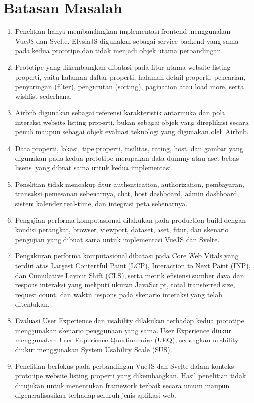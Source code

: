 \documentclass[12pt,a4paper]{report}
\begin{document}
\section{Batasan Masalah}
\begin{enumerate}
    \item Penelitian hanya membandingkan implementasi frontend menggunakan VueJS dan Svelte. ElysiaJS digunakan sebagai service backend yang sama pada kedua prototipe dan tidak menjadi objek utama perbandingan.
    \item Prototipe yang dikembangkan dibatasi pada fitur utama website listing properti, yaitu halaman daftar properti, halaman detail properti, pencarian, penyaringan (filter), pengurutan (sorting), pagination atau load more, serta wishlist sederhana.
    \item Airbnb digunakan sebagai referensi karakteristik antarmuka dan pola interaksi website listing properti, bukan sebagai objek yang direplikasi secara penuh maupun sebagai objek evaluasi teknologi yang digunakan oleh Airbnb.
    \item Data properti, lokasi, tipe properti, fasilitas, rating, host, dan gambar yang digunakan pada kedua prototipe merupakan data dummy atau aset bebas lisensi yang dibuat sama untuk kedua implementasi.
    \item Penelitian tidak mencakup fitur authentication, authorization, pembayaran, transaksi pemesanan sebenarnya, chat, host dashboard, admin dashboard, sistem kalender real-time, dan integrasi peta sebenarnya.
    \item Pengujian performa komputasional dilakukan pada production build dengan kondisi perangkat, browser, viewport, dataset, aset, fitur, dan skenario pengujian yang dibuat sama untuk implementasi VueJS dan Svelte.
    \item Pengukuran performa komputasional dibatasi pada Core Web Vitals yang terdiri atas Largest Contentful Paint (LCP), Interaction to Next Paint (INP), dan Cumulative Layout Shift (CLS), serta metrik efisiensi sumber daya dan respons interaksi yang meliputi ukuran JavaScript, total transferred size, request count, dan waktu respons pada skenario interaksi yang telah ditentukan.
    \item Evaluasi User Experience dan usability dilakukan terhadap kedua prototipe menggunakan skenario penggunaan yang sama. User Experience diukur menggunakan User Experience Questionnaire (UEQ), sedangkan usability diukur menggunakan System Usability Scale (SUS).
    \item Penelitian berfokus pada perbandingan VueJS dan Svelte dalam konteks prototipe website listing properti yang dikembangkan. Hasil penelitian tidak ditujukan untuk menentukan framework terbaik secara umum maupun digeneralisasikan terhadap seluruh jenis aplikasi web.
\end{enumerate}
\end{document}
